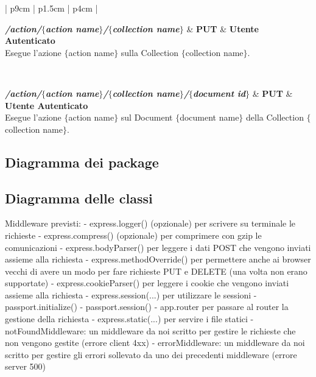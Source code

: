 \begin{center}
\begin{longtable}{| p{9cm} | p{1.5cm} | p{4cm} |}
	 {} \\ \hline
	
	\textbf{\emph{/action/$\{$action name$\}$/$\{$collection name$\}$}} & \textbf{PUT} & \textbf{Utente Autenticato} \\ \hline
	 {Esegue l'azione $\{$action name$\}$ sulla Collection $\{$collection name$\}$.}  \\ 
	\specialrule{1pt}{1pt}{1pt}
	
	 {} \\ \hline
	
	\textbf{\emph{/action/$\{$action name$\}$/$\{$collection name$\}$/$\{$document id$\}$}} & \textbf{PUT} & \textbf{Utente Autenticato} \\ \hline
	 {Esegue l'azione $\{$action name$\}$ sul Document $\{$document name$\}$ della Collection 
	$\{$collection name$\}$.}  \\ 
	\specialrule{1pt}{1pt}{1pt}

	
\end{longtable}
	  \egroup
\end{center}

\subsection{Diagramma dei package}

\subsection{Diagramma delle classi}


Middleware previsti:
- express.logger() (opzionale) per scrivere su terminale le richieste
- express.compress() (opzionale) per comprimere con gzip le comunicazioni
- express.bodyParser() per leggere i dati POST che vengono inviati assieme alla richiesta
- express.methodOverride() per permettere anche ai browser vecchi di avere un modo per fare richieste PUT e DELETE (una volta non erano supportate)
- express.cookieParser() per leggere i cookie che vengono inviati assieme alla richiesta
- express.session(...) per utilizzare le sessioni
- passport.initialize()
- passport.session()
- app.router per passare al router la gestione della richiesta
- express.static(...) per servire i file statici
- notFoundMiddleware: un middleware da noi scritto per gestire le richieste che non vengono gestite (errore client 4xx)
- errorMiddleware: un middleware da noi scritto per gestire gli errori sollevato da uno dei precedenti middleware (errore server 500)


